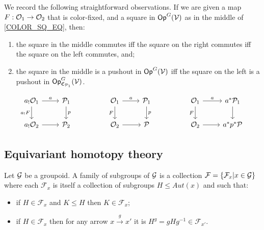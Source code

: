 \documentclass[a4paper,10pt
,draft
]{article}%
\renewcommand{\F}{\mathcal F}
\renewcommand{\1}{\eta}%
\begin{document}
\begin{remark}\label{COLOR_SQ_REM}
      We record the following straightforward observations.
      If we are given a map $F: \mathcal{O}_1 \to \mathcal{O}_2$ that is color-fixed,
      and a square in $\mathsf{Op}^G(\mathcal V)$ as in the middle of \eqref{COLOR_SQ_EQ}, then:
      \begin{enumerate}[label = (\roman*)]
      \item the square in the middle commutes iff the square on the right commutes iff the square on the left commutes, and;
      \item the square in the middle is a pushout in $\mathsf{Op}^G(\mathcal V)$ iff
            the square on the left is a pushout in $\mathsf{Op}^{G}_{\mathfrak C_{\mathcal{P}_1}}(\mathcal V)$.
      \end{enumerate}
      \begin{equation}
            \label{COLOR_SQ_EQ}
            \begin{tikzcd}
                  a_! \O_1 \arrow[d, "a_! F"'] \arrow[r, "a"]
                  &
                  \P_1 \arrow[d, "p"]
                  &&
                  \O_1 \arrow[d, "F"'] \arrow[r, "a"]
                  &
                  \P_1 \arrow[d, "p"]
                  &&
                  \O_1 \arrow[d, "F"'] \arrow[r, "a"]
                  &
                  a^{\**} \P_1 \arrow[d]
                  \\
                  a_! \O_2 \arrow[r]
                  &
                  \P_2
                  &&
                  \O_2 \arrow[r]
                  &
                  \P
                  &&
                  \O_2 \arrow[r]
                  &
                  a^{\**} p^{\**} \P
            \end{tikzcd}
      \end{equation}
\end{remark}







\subsection{Equivariant homotopy theory}
\label{EHT_SEC}


\begin{definition}\label{FAMGROUPOID DEF}
Let $\mathcal{G}$ be a groupoid.
A family of subgroups of $\mathcal{G}$
is a collection 
$\mathcal{F} = \left\{\mathcal{F}_x | x\in \mathcal{G}\right\}$
where each $\F_x$ is itself a collection of subgroups
$H \leq Aut(x)$ and such that:
\begin{itemize}
\item if $H \in \F_x$ and $K \leq H$ then $K \in \mathcal{F}_x$;
\item if $H \in \mathcal{F}_x$
then for any arrow $x \xrightarrow{g} x'$
it is $H^g=g H g^{-1} \in \mathcal{F}_{x'}$.
\end{itemize}
\end{definition}
\end{document}
